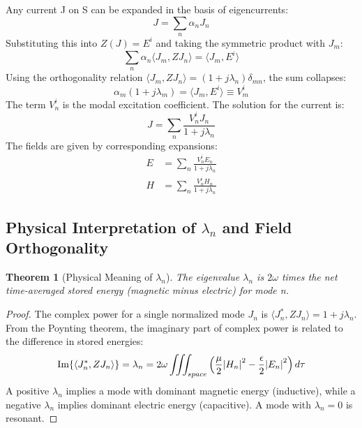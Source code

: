 \documentclass[11pt,a4paper]{article}
\newcommand{\avg}[1]{\langle #1 \rangle} %
\newtheorem{theorem}{Theorem}[section]
\begin{document}
Any current J on S can be expanded in the basis of eigencurrents:
\begin{equation}
    J=\sum_{n}\alpha_{n}J_{n}
\end{equation}
Substituting this into \(Z(J)=E^{i}\) and taking the symmetric product with \(J_{m}\):
\begin{equation}
    \sum_{n}\alpha_{n}\avg{ J_{m},ZJ_{n}}=\avg{ J_{m},E^{i}}
\end{equation}
Using the orthogonality relation \(\avg{ J_{m},ZJ_{n}}=(1+j\lambda_{n})\delta_{mn}\), the sum collapses:
\begin{equation}
    \alpha_{m}(1+j\lambda_{m})=\avg{ J_{m},E^{i}}\equiv V_{m}^{i}
\end{equation}
The term \(V_{n}^{i}\) is the modal excitation coefficient. The solution for the current is:
\begin{equation}
    J=\sum_{n}\frac{V_{n}^{i}J_{n}}{1+j\lambda_{n}}
\end{equation}
The fields are given by corresponding expansions:
\begin{align}
    E &= \sum_{n}\frac{V_{n}^{i}E_{n}}{1+j\lambda_{n}} \\
    H &= \sum_{n}\frac{V_{n}^{i}H_{n}}{1+j\lambda_{n}}
\end{align}

\subsection{Physical Interpretation of \(\lambda_{n}\) and Field Orthogonality}

\begin{theorem}[Physical Meaning of \(\lambda_{n}\)]
The eigenvalue \(\lambda_{n}\) is \(2\omega\) times the net time-averaged stored energy (magnetic minus electric) for mode n.
\end{theorem}
\begin{proof}
The complex power for a single normalized mode \(J_{n}\) is \(\avg{ J_{n}^{*},ZJ_{n}}=1+j\lambda_{n}\). From the Poynting theorem, the imaginary part of complex power is related to the difference in stored energies:
\begin{equation}
    \text{Im}\{\avg{ J_{n}^{*},ZJ_{n}}\}=\lambda_{n}=2\omega\iiint_{space}\left(\frac{\mu}{2}\abs{H_{n}}^{2}-\frac{\epsilon}{2}\abs{E_{n}}^{2}\right)d\tau
\end{equation}
A positive \(\lambda_{n}\) implies a mode with dominant magnetic energy (inductive), while a negative \(\lambda_{n}\) implies dominant electric energy (capacitive). A mode with \(\lambda_{n}=0\) is resonant.
\end{proof}
\end{document}
